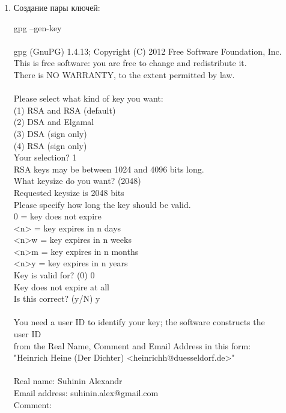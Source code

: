 \documentclass{article}
\begin{document}
\begin{enumerate}
\item Создание пары ключей:

gpg --gen-key\\
\\
gpg (GnuPG) 1.4.13; Copyright (C) 2012 Free Software Foundation, Inc.\\
This is free software: you are free to change and redistribute it.\\
There is NO WARRANTY, to the extent permitted by law.\\
\\
Please select what kind of key you want:\\
   (1) RSA and RSA (default)\\
   (2) DSA and Elgamal\\
   (3) DSA (sign only)\\
   (4) RSA (sign only)\\
Your selection? 1\\
RSA keys may be between 1024 and 4096 bits long.\\
What keysize do you want? (2048)\\
Requested keysize is 2048 bits\\
Please specify how long the key should be valid.\\
         0 = key does not expire\\
      <n>  = key expires in n days\\
      <n>w = key expires in n weeks\\
      <n>m = key expires in n months\\
      <n>y = key expires in n years\\
Key is valid for? (0) 0\\
Key does not expire at all\\
Is this correct? (y/N) y\\
\\
You need a user ID to identify your key; the software constructs the\\ user ID\\
from the Real Name, Comment and Email Address in this form:\\
    "Heinrich Heine (Der Dichter) <heinrichh@duesseldorf.de>"\\
\\
Real name: Suhinin Alexandr\\
Email address: suhinin.alex@gmail.com\\
Comment:\\

\end{enumerate}
\end{document}
